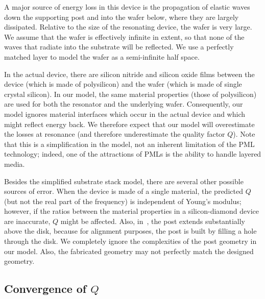\documentclass{article}
\begin{document}
A major source of energy loss in this device is the propagation of
elastic waves down the supporting post and into the wafer below, where
they are largely dissipated.  Relative to the size of the resonating
device, the wafer is very large.  We assume that the wafer is
effectively infinite in extent, so that none of the waves that radiate
into the substrate will be reflected.  We use a perfectly matched
layer to model the wafer as a semi-infinite half space.

In the actual device, there are silicon nitride and silicon oxide
films between the device (which is made of polysilicon) and the wafer
(which is made of single crystal silicon).  In our model, the same
material properties (those of polysilicon) are used for both the
resonator and the underlying wafer.  Consequently, our model ignores
material interfaces which occur in the actual device and which might
reflect energy back.  We therefore expect that our model will
overestimate the losses at resonance (and therefore underestimate the
quality factor $Q$).  Note that this is a simplification in the model,
not an inherent limitation of the PML technology; indeed, one of the
attractions of PMLs is the ability to handle layered media.

Besides the simplified substrate stack model, there are several other
possible sources of error.  When the device is made of a single
material, the predicted $Q$ (but not the real part of the frequency)
is independent of Young's modulus; however, if the ratios between the
material properties in a silicon-diamond device are inaccurate, $Q$
might be affected.  Also, in~\cite{Wang:2003:SAG,Wang:2004:GND}, the
post extends substantially above the disk, because for alignment
purposes, the post is built by filling a hole through the disk.  We
completely ignore the complexities of the post geometry in our model.
Also, the fabricated geometry may not perfectly match the designed
geometry.


\subsection{Convergence of $Q$}
\end{document}
